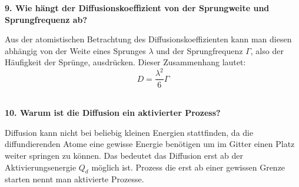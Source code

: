 \noindent\textbf{9. Wie hängt der Diffusionskoeffizient von der Sprungweite und Sprungfrequenz ab?}\\
\begin{addmargin}[25pt]{0pt}
Aus der atomistischen Betrachtung des Diffusionskoeffizienten kann man diesen abhängig von der Weite eines Sprunges $\lambda$ und der Sprungfrequenz $\Gamma$, also der Häufigkeit der Sprünge, ausdrücken. Dieser Zusammenhang lautet:
\begin{equation}\label{eq:Diffusion_atomistisch}
    D = \frac{\lambda^2}{6}\Gamma
\end{equation}\\
\end{addmargin} 

\noindent\textbf{10. Warum ist die Diffusion ein aktivierter Prozess? }\\
\begin{addmargin}[25pt]{0pt}
Diffusion kann nicht bei beliebig kleinen Energien stattfinden, da die diffundierenden Atome eine gewisse Energie benötigen um im Gitter einen Platz weiter springen zu können. Das bedeutet das Diffusion erst ab der Aktivierungsenergie $Q_d$  möglich ist. Prozess die erst ab einer gewissen Grenze starten nennt man aktivierte Prozesse.\\
\end{addmargin} 

\newpage

